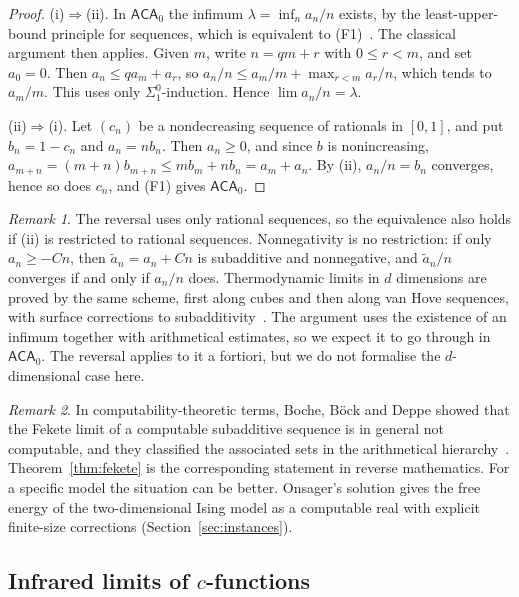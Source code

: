 \documentclass[11pt]{article}
\theoremstyle{definition}\newtheorem{definition}{Definition}[section]
\theoremstyle{remark}\newtheorem*{remark}{Remark}
\newcommand{\ACA}{\mathsf{ACA}_0}
\begin{document}
\begin{proof}
(i)$\Rightarrow$(ii). In $\ACA$ the infimum $\lambda=\inf_na_n/n$ exists, by the least-upper-bound principle for sequences, which
is equivalent to (F1)~\cite{Simpson}. The classical argument then applies. Given $m$, write $n=qm+r$ with $0\le r<m$, and set $a_0=0$. Then
$a_n\le qa_m+a_r$, so $a_n/n\le a_m/m+\max_{r<m}a_r/n$, which tends to $a_m/m$. This uses only $\Sigma^0_1$-induction. Hence $\lim
a_n/n=\lambda$.

(ii)$\Rightarrow$(i). Let $(c_n)$ be a nondecreasing sequence of rationals in $[0,1]$, and put $b_n=1-c_n$ and $a_n=nb_n$. Then
$a_n\ge0$, and since $b$ is nonincreasing, $a_{m+n}=(m+n)b_{m+n}\le mb_m+nb_n=a_m+a_n$. By (ii), $a_n/n=b_n$ converges, hence so
does $c_n$, and (F1) gives $\ACA$.
\end{proof}

\begin{remark}
The reversal uses only rational sequences, so the equivalence also holds if (ii) is restricted to rational sequences.
Nonnegativity is no restriction: if only $a_n\ge-Cn$, then $\tilde a_n=a_n+Cn$ is subadditive and nonnegative, and $\tilde a_n/n$ converges
if and only if $a_n/n$ does. Thermodynamic limits in $d$ dimensions are proved by the same scheme, first along cubes and then
along van Hove sequences, with surface corrections to subadditivity~\cite{Ruelle}. The argument uses the existence of an
infimum together with arithmetical estimates, so we expect it to go through in $\ACA$. The reversal applies to it a
fortiori, but we do not formalise the $d$-dimensional case here.
\end{remark}

\begin{remark}
In computability-theoretic terms, Boche, B\"ock and Deppe showed that the Fekete limit of a computable subadditive
sequence is in general not computable, and they classified the associated sets in the arithmetical
hierarchy~\cite{BocheBockDeppe}. Theorem~\ref{thm:fekete} is the corresponding statement in reverse mathematics. For a
specific model the situation can be better. Onsager's solution gives the free energy of the two-dimensional Ising
model as a computable real with explicit finite-size corrections (Section~\ref{sec:instances}).
\end{remark}

\subsection{\texorpdfstring{Infrared limits of $c$-functions}{Infrared limits of c-functions}}
\end{document}
